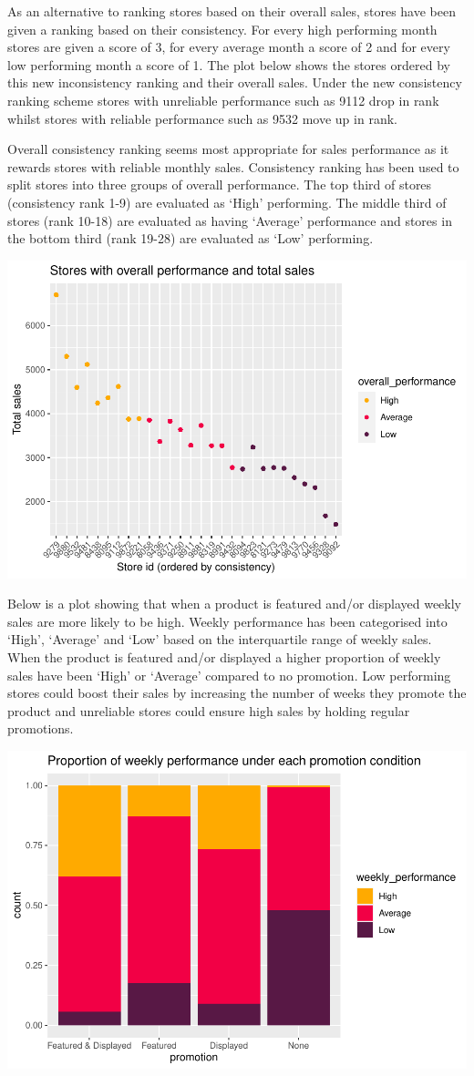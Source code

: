 \documentclass[
  11pt,
]{article}
\begin{document}
As an alternative to ranking stores based on their overall sales, stores
have been given a ranking based on their consistency. For every high
performing month stores are given a score of 3, for every average month
a score of 2 and for every low performing month a score of 1. The plot
below shows the stores ordered by this new inconsistency ranking and
their overall sales. Under the new consistency ranking scheme stores
with unreliable performance such as 9112 drop in rank whilst stores with
reliable performance such as 9532 move up in rank.

Overall consistency ranking seems most appropriate for sales performance
as it rewards stores with reliable monthly sales. Consistency ranking
has been used to split stores into three groups of overall performance.
The top third of stores (consistency rank 1-9) are evaluated as `High'
performing. The middle third of stores (rank 10-18) are evaluated as
having `Average' performance and stores in the bottom third (rank 19-28)
are evaluated as `Low' performing.

\includegraphics[width=0.75\linewidth]{Assignment-STAT702---final_files/figure-latex/new ranking-1}

Below is a plot showing that when a product is featured and/or displayed
weekly sales are more likely to be high. Weekly performance has been
categorised into `High', `Average' and `Low' based on the interquartile
range of weekly sales. When the product is featured and/or displayed a
higher proportion of weekly sales have been `High' or `Average' compared
to no promotion. Low performing stores could boost their sales by
increasing the number of weeks they promote the product and unreliable
stores could ensure high sales by holding regular promotions.

\includegraphics[width=0.5\linewidth]{Assignment-STAT702---final_files/figure-latex/1b promotion conditions-1}
\end{document}
